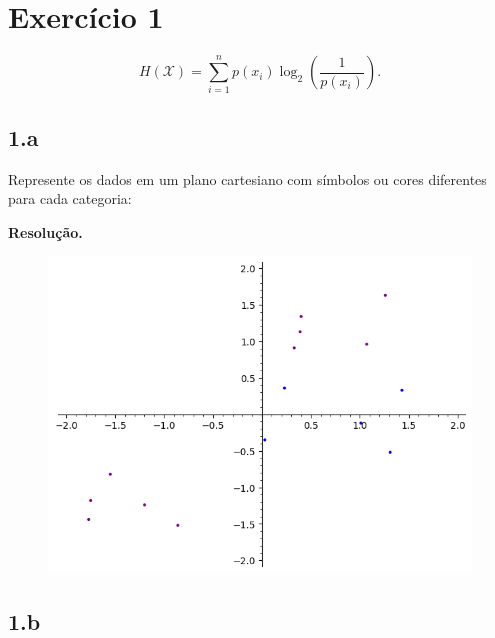 \documentclass[12pt,letterpaper]{article}
\newcommand\answer{\textbf{Resolução.}\xspace}
\begin{document}
\section*{Exercício 1}

\[
    H \left( \mathcal{X} \right) = \sum_{i = 1}^{n} p(x_i) \log_2 \left( \frac{1}{p(x_i)} \right).
\]

\subsection*{1.a}

Represente os dados em um plano cartesiano com símbolos ou cores diferentes para cada categoria:

\answer \\

\begin{figure}[h]
	\center
	\includegraphics{ ex_1_1.png }
\end{figure}


\subsection*{1.b}
\end{document}
